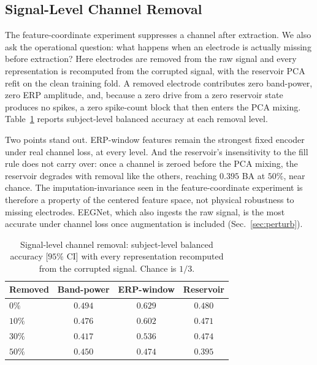 \documentclass[conference]{IEEEtran}
\begin{document}
\subsection{Signal-Level Channel Removal}
\label{sec:rawsignal}
The feature-coordinate experiment suppresses a channel after extraction. We also ask the operational question: what happens when an electrode is actually missing before extraction? Here electrodes are removed from the raw signal and every representation is recomputed from the corrupted signal, with the reservoir PCA refit on the clean training fold. A removed electrode contributes zero band-power, zero ERP amplitude, and, because a zero drive from a zero reservoir state produces no spikes, a zero spike-count block that then enters the PCA mixing. Table~\ref{tab:rawsignal} reports subject-level balanced accuracy at each removal level.

Two points stand out. ERP-window features remain the strongest fixed encoder under real channel loss, at every level. And the reservoir's insensitivity to the fill rule does not carry over: once a channel is zeroed before the PCA mixing, the reservoir degrades with removal like the others, reaching $0.395$ BA at $50\%$, near chance. The imputation-invariance seen in the feature-coordinate experiment is therefore a property of the centered feature space, not physical robustness to missing electrodes. EEGNet, which also ingests the raw signal, is the most accurate under channel loss once augmentation is included (Sec.~\ref{sec:perturb}).

\begin{table}[t]
\caption{Signal-level channel removal: subject-level balanced accuracy [$95\%$ CI] with every representation recomputed from the corrupted signal. Chance is $1/3$.}
\label{tab:rawsignal}
\centering
\small
\setlength{\tabcolsep}{4pt}
\begin{tabular}{lccc}
\toprule
Removed & Band-power & ERP-window & Reservoir \\
\midrule
$0\%$  & $0.494$ & $0.629$ & $0.480$ \\
$10\%$ & $0.476$ & $0.602$ & $0.471$ \\
$30\%$ & $0.417$ & $0.536$ & $0.474$ \\
$50\%$ & $0.450$ & $0.474$ & $0.395$ \\
\bottomrule
\end{tabular}
\end{table}
\end{document}
